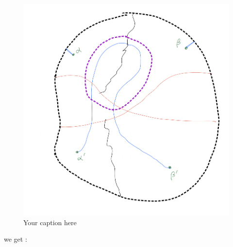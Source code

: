 \begin{figure}[H] %
    \centering
    \includegraphics[width=\linewidth]{diagrams/definition10/8.png} %
    \caption{Your caption here}
    \label{fig:your-label}
\end{figure}

we get :

